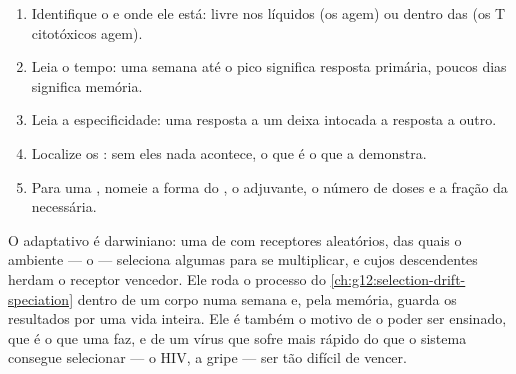 \begin{method}\label{met:g12:adaptive-immunity:read}
\begin{enumerate}
  \item Identifique o  e onde ele está: livre nos líquidos (os
         agem) ou dentro das  (os  T
        citotóxicos agem).
  \item Leia o tempo: uma semana até o pico significa resposta
        primária, poucos dias significa memória.
  \item Leia a especificidade: uma resposta a um  deixa
        intocada a resposta a outro.
  \item Localize os : sem eles nada acontece, o
        que é o que a  demonstra.
  \item Para uma , nomeie a forma do , o adjuvante, o
        número de doses e a fração da  necessária.
\end{enumerate}
\end{method}

\begin{remark}\label{rem:g12:adaptive-immunity:selection}
O  adaptativo é darwiniano: uma  de 
com receptores aleatórios, das quais o ambiente --- o  ---
seleciona algumas para se multiplicar, e cujos descendentes herdam o
receptor vencedor. Ele roda o processo do
\cref{ch:g12:selection-drift-speciation} dentro de um corpo numa
semana e, pela memória, guarda os resultados por uma vida inteira. Ele
é também o motivo de o  poder ser ensinado, que é o
que uma  faz, e de um vírus que sofre  mais rápido do que
o sistema consegue selecionar --- o HIV, a gripe --- ser tão difícil de vencer.
\end{remark}

